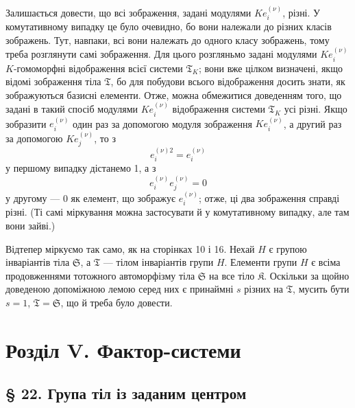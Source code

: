 \documentclass[11pt]{article}
\begin{document}
Залишається довести, що всі зображення, задані модулями \(K e_i^{(\nu)}\), різні. У комутативному випадку це було очевидно, бо вони належали до різних класів зображень. Тут, навпаки, всі вони належать до одного класу зображень, тому треба розглянути самі зображення. Для цього розгляньмо задані модулями \(K e_i^{(\nu)}\) \(K\)-гомоморфні відображення всієї системи \(\mathfrak T_K\); вони вже цілком визначені, якщо відомі зображення тіла \(\mathfrak T\), бо для побудови всього відображення досить знати, як зображуються базисні елементи. Отже, можна обмежитися доведенням того, що задані в такий спосіб модулями \(K e_i^{(\nu)}\) відображення системи \(\mathfrak T_K\) усі різні. Якщо зобразити \(e_i^{(\nu)}\) один раз за допомогою модуля зображення \(K e_i^{(\nu)}\), а другий раз за допомогою \(K e_j^{(\nu)}\), то з
\[
e_i^{(\nu)2}=e_i^{(\nu)}
\]
у першому випадку дістанемо 1, а з
\[
e_i^{(\nu)}e_j^{(\nu)}=0
\]
у другому --- 0 як елемент, що зображує \(e_i^{(\nu)}\); отже, ці два зображення справді різні. (Ті самі міркування можна застосувати й у комутативному випадку, але там вони зайві.)

Відтепер міркуємо так само, як на сторінках 10 і 16. Нехай \(H\) є групою інваріантів тіла \(\mathfrak S\), а \(\mathfrak T\) --- тілом інваріантів групи \(H\). Елементи групи \(H\) є всіма продовженнями тотожного автоморфізму тіла \(\mathfrak S\) на все тіло \(\mathfrak K\). Оскільки за щойно доведеною допоміжною лемою серед них є принаймні \(s\) різних на \(\mathfrak T\), мусить бути \(s=1\), \(\mathfrak T=\mathfrak S\), що й треба було довести.

\section*{Розділ V. Фактор-системи}\label{kapitel-v.-faktorensysteme}

\subsection*{§ 22. Група тіл із заданим центром}\label{die-gruppe-der-koerper-mit-gegebenem-zentrum}
\end{document}
